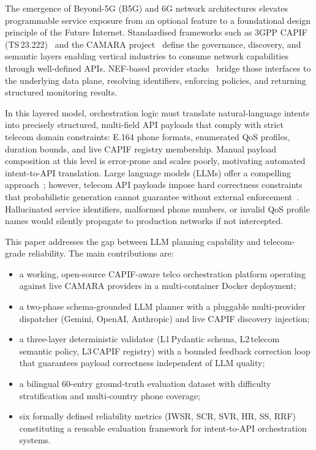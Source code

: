 \documentclass[conference]{IEEEtran}
\begin{document}
The emergence of Beyond-5G (B5G) and 6G network architectures elevates
programmable service exposure from an optional feature to a foundational
design principle of the Future Internet.
Standardised frameworks such as 3GPP CAPIF (TS\,23.222)~\cite{3gpp_capif}
and the CAMARA project~\cite{camara2022} define the governance, discovery,
and semantic layers enabling vertical industries to consume network
capabilities through well-defined APIs.
NEF-based provider stacks~\cite{nefsim2022} bridge those interfaces to the
underlying data plane, resolving identifiers, enforcing policies, and
returning structured monitoring results.

In this layered model, orchestration logic must translate natural-language
intents into precisely structured, multi-field API payloads that comply with
strict telecom domain constraints: E.164 phone formats, enumerated QoS
profiles, duration bounds, and live CAPIF registry membership.
Manual payload composition at this level is error-prone and scales poorly,
motivating automated intent-to-API translation.
Large language models (LLMs) offer a compelling approach~\cite{maatouk2025,flowmind2023};
however, telecom API payloads impose hard correctness constraints that
probabilistic generation cannot guarantee without external
enforcement~\cite{liu2024,telagentbench2025}.
Hallucinated service identifiers, malformed phone numbers, or invalid QoS
profile names would silently propagate to production networks if not
intercepted.

This paper addresses the gap between LLM planning capability and
telecom-grade reliability. The main contributions are:

\begin{itemize}[leftmargin=1.1em]
  \item a working, open-source CAPIF-aware telco orchestration platform
        operating against live CAMARA providers in a multi-container
        Docker deployment;
  \item a two-phase schema-grounded LLM planner with a pluggable
        multi-provider dispatcher (Gemini, OpenAI, Anthropic) and live
        CAPIF discovery injection;
  \item a three-layer deterministic validator (L1\,Pydantic schema,
        L2\,telecom semantic policy, L3\,CAPIF registry) with a bounded
        feedback correction loop that guarantees payload correctness
        independent of LLM quality;
  \item a bilingual 60-entry ground-truth evaluation dataset
        with difficulty stratification and multi-country phone coverage;
  \item six formally defined reliability metrics (IWSR, SCR, SVR, HR, SS,
        RRF) constituting a reusable evaluation framework for
        intent-to-API orchestration systems.
\end{itemize}
\end{document}
